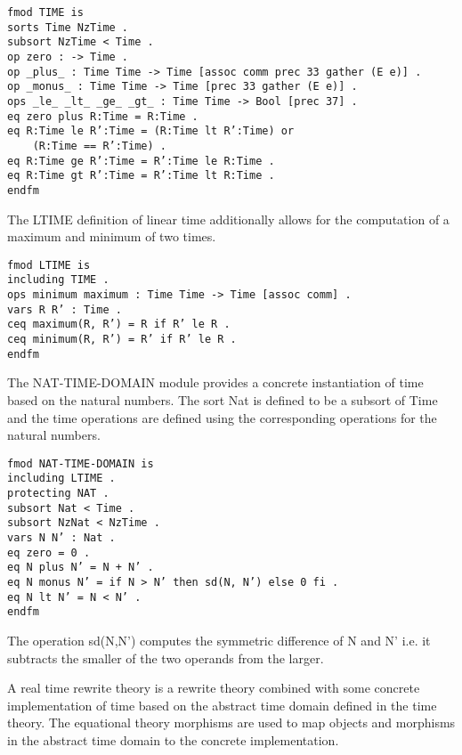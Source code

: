 \begin{lstlisting}[caption = "The TIME specification in Real Time Maude"]
fmod TIME is
sorts Time NzTime .
subsort NzTime < Time .
op zero : -> Time .
op _plus_ : Time Time -> Time [assoc comm prec 33 gather (E e)] .
op _monus_ : Time Time -> Time [prec 33 gather (E e)] .
ops _le_ _lt_ _ge_ _gt_ : Time Time -> Bool [prec 37] .
eq zero plus R:Time = R:Time .
eq R:Time le R’:Time = (R:Time lt R’:Time) or 
	(R:Time == R’:Time) .
eq R:Time ge R’:Time = R’:Time le R:Time .
eq R:Time gt R’:Time = R’:Time lt R:Time .
endfm
\end{lstlisting}
The  LTIME definition  \cite{PO02}  of linear time additionally allows for the computation of a maximum and minimum of two times.
\begin{lstlisting}[caption = "The LTIME specification in Real Time Maude"]
fmod LTIME is
including TIME .
ops minimum maximum : Time Time -> Time [assoc comm] .
vars R R’ : Time .
ceq maximum(R, R’) = R if R’ le R .
ceq minimum(R, R’) = R’ if R’ le R .
endfm
\end{lstlisting}
 
The NAT-TIME-DOMAIN module  \cite{PO02}  provides a concrete instantiation of time based on the natural numbers. The sort Nat is defined to be a subsort of Time and the time operations are defined using the corresponding operations for the natural numbers.

\begin{lstlisting}[caption = "The Natural Number Time Domain in Real Time Maude "]
fmod NAT-TIME-DOMAIN is
including LTIME .
protecting NAT .
subsort Nat < Time .
subsort NzNat < NzTime .
vars N N’ : Nat .
eq zero = 0 .
eq N plus N’ = N + N’ .
eq N monus N’ = if N > N’ then sd(N, N’) else 0 fi .
eq N lt N’ = N < N’ .
endfm
\end{lstlisting}

The operation sd(N,N') computes the symmetric difference of N and N' i.e. it subtracts the smaller of the two operands from the larger.

A real time rewrite theory \cite{PO02} is a rewrite theory combined with some concrete implementation of time based on the abstract time domain defined in the time theory. The equational theory morphisms are used to map objects and morphisms in the abstract time domain to the concrete implementation.

